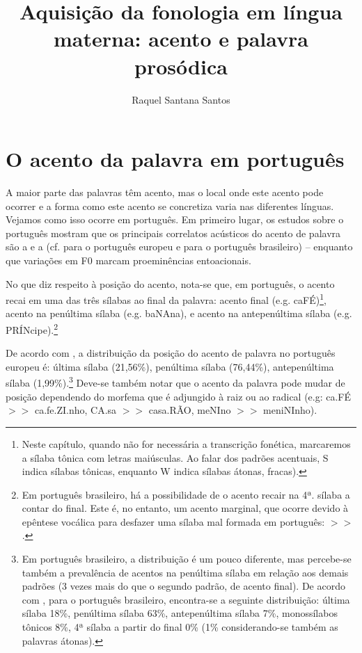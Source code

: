 \documentclass[output=paper]{LSP/langsci}
\author{Raquel Santana Santos\affiliation{Universidade de São Paulo}
}
\title{Aquisição da fonologia em língua materna: acento e
palavra prosódica}
\begin{document}
\section{O acento da palavra em português}
\label{sec:santana_acento}

A maior parte das palavras têm acento, mas o local onde este acento pode ocorrer e a forma como este acento se concretiza varia nas diferentes línguas. Vejamos como isso ocorre em português. Em primeiro lugar, os estudos sobre o português mostram que os principais correlatos acústicos do acento de palavra são a  e a  (cf. \citealt{delgadomartins2002} para o português europeu e \citealt{barbosa2006} para o português brasileiro) -- enquanto que variações em F0 marcam proeminências entoacionais.

No que diz respeito à posição do acento, nota-se que, em português, o acento recai em uma das três sílabas ao final da palavra: acento final (e.g. caFÉ)\footnote{Neste capítulo, quando não for necessária a transcrição fonética, marcaremos a sílaba tônica com letras maiúsculas. Ao falar dos padrões acentuais, S indica sílabas tônicas, enquanto W indica sílabas átonas, fracas).}, acento na penúltima sílaba (e.g. baNAna), e acento na antepenúltima sílaba (e.g. PRÍNcipe).\footnote{Em português brasileiro, há a possibilidade de o acento recair na 4ª. sílaba a contar do final. Este é, no entanto, um acento marginal, que ocorre devido à epêntese vocálica para desfazer uma sílaba mal formada em português:  $>>$ \textipa{[\pstr tE.ki.ni.ka]}.}

De acordo com \citealt{vigario_etal2006}, a distribuição da posição do acento de palavra no português europeu é: última sílaba (21,56\%), penúltima sílaba (76,44\%), antepenúltima sílaba (1,99\%).\footnote{Em português brasileiro, a distribuição é um pouco diferente, mas percebe-se também a prevalência de acentos na penúltima sílaba em relação aos demais padrões (3 vezes mais do que o segundo padrão, de acento final). De acordo com \citet{cintra1997}, para o português brasileiro, encontra-se a seguinte distribuição: última sílaba 18\%, penúltima sílaba 63\%, antepenúltima sílaba 7\%, monossílabos tônicos 8\%, 4ª sílaba a partir do final 0\% (1\% considerando-se também as palavras átonas).} Deve-se também notar que o acento da palavra pode mudar de posição dependendo do morfema que é adjungido à raiz ou ao radical (e.g: ca.FÉ $>>$ ca.fe.ZI.nho, CA.sa $>>$ casa.RÃO, meNIno $>>$ meniNInho).
\end{document}
